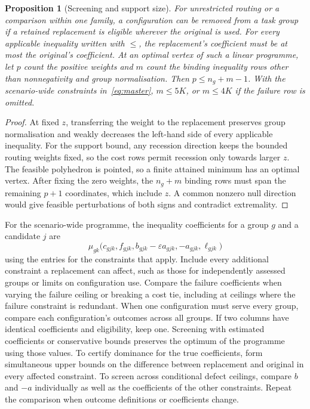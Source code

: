 \documentclass[11pt,reqno]{amsart}
\newtheorem{proposition}[theorem]{Proposition}
\theoremstyle{definition}
\theoremstyle{remark}
\begin{document}
\begin{proposition}[Screening and support size]\label{prop:reduction}
For unrestricted routing or a comparison within one family, a configuration can be removed from a task group if a retained replacement is eligible wherever the original is used. For every applicable inequality written with \(\le\), the replacement's coefficient must be at most the original's coefficient.
At an optimal vertex of such a linear programme, let \(p\) count the positive weights and \(m\) count the binding inequality rows other than nonnegativity and group normalisation. Then \(p\le n_g+m-1\). With the scenario-wide constraints in~\eqref{eq:master}, \(m\le5K\), or \(m\le4K\) if the failure row is omitted.
\end{proposition}
\begin{proof}
At fixed \(z\), transferring the weight to the replacement preserves group normalisation and weakly decreases the left-hand side of every applicable inequality. For the support bound, any recession direction keeps the bounded routing weights fixed, so the cost rows permit recession only towards larger \(z\). The feasible polyhedron is pointed, so a finite attained minimum has an optimal vertex. After fixing the zero weights, the \(n_g+m\) binding rows must span the remaining \(p+1\) coordinates, which include \(z\). A common nonzero null direction would give feasible perturbations of both signs and contradict extremality.
\end{proof}

For the scenario-wide programme, the inequality coefficients for a group \(g\) and a candidate \(j\) are
\[
 \mu_{gk}\bigl(c_{gjk},f_{gjk},b_{gjk}-\varepsilon a_{gjk},
                       -a_{gjk},\ell_{gjk}\bigr)
\]
using the entries for the constraints that apply. Include every additional constraint a replacement can affect, such as those for independently assessed groups or limits on configuration use. Compare the failure coefficients when varying the failure ceiling or breaking a cost tie, including at ceilings where the failure constraint is redundant. When one configuration must serve every group, compare each configuration's outcomes across all groups. If two columns have identical coefficients and eligibility, keep one. Screening with estimated coefficients or conservative bounds preserves the optimum of the programme using those values. To certify dominance for the true coefficients, form simultaneous upper bounds on the difference between replacement and original in every affected constraint. To screen across conditional defect ceilings, compare \(b\) and \(-a\) individually as well as the coefficients of the other constraints. Repeat the comparison when outcome definitions or coefficients change.
\end{document}
